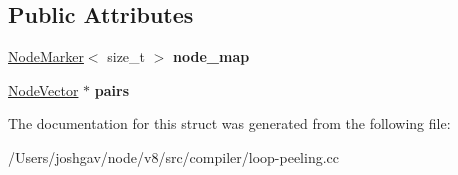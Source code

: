 \subsection*{Public Attributes}
\begin{DoxyCompactItemize}
\item 
\hyperlink{classv8_1_1internal_1_1compiler_1_1_node_marker}{Node\+Marker}$<$ size\+\_\+t $>$ {\bfseries node\+\_\+map}\hypertarget{structv8_1_1internal_1_1compiler_1_1_peeling_a17486dbe74dcb340c36d29853b401efd}{}\label{structv8_1_1internal_1_1compiler_1_1_peeling_a17486dbe74dcb340c36d29853b401efd}

\item 
\hyperlink{classv8_1_1internal_1_1_zone_vector}{Node\+Vector} $\ast$ {\bfseries pairs}\hypertarget{structv8_1_1internal_1_1compiler_1_1_peeling_a0567f90a9610ee19793e528d90f1478c}{}\label{structv8_1_1internal_1_1compiler_1_1_peeling_a0567f90a9610ee19793e528d90f1478c}

\end{DoxyCompactItemize}


The documentation for this struct was generated from the following file\+:\begin{DoxyCompactItemize}
\item 
/\+Users/joshgav/node/v8/src/compiler/loop-\/peeling.\+cc\end{DoxyCompactItemize}
